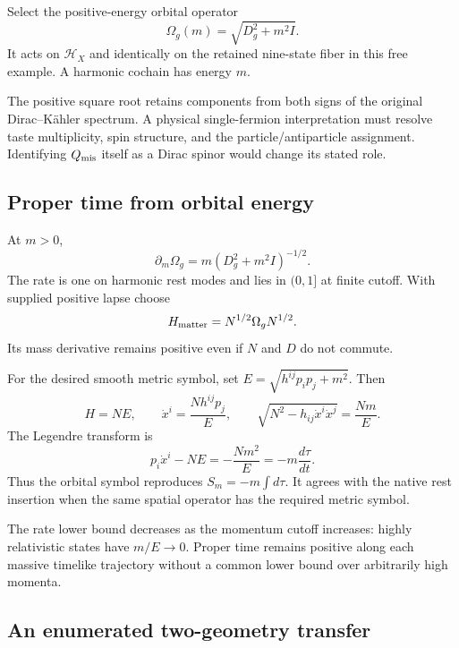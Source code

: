 Select the positive-energy orbital operator
\begin{equation}
\Omega_g(m)=\sqrt{D_g^2+m^2I}.
\label{eq:omega}
\end{equation}
It acts on $\mathcal H_X$ and identically on the retained nine-state fiber in this free example. A harmonic cochain has energy $m$.

The positive square root retains components from both signs of the original Dirac--Kähler spectrum. A physical single-fermion interpretation must resolve taste multiplicity, spin structure, and the particle/antiparticle assignment. Identifying $Q_{\rm mis}$ itself as a Dirac spinor would change its stated role.

\subsection{Proper time from orbital energy}

At $m>0$,
\begin{equation}
\partial_m\Omega_g=m(D_g^2+m^2I)^{-1/2}.
\end{equation}
The rate is one on harmonic rest modes and lies in $(0,1]$ at finite cutoff. With supplied positive lapse choose
\begin{equation}
H_{\rm matter}=N^{1/2}\Omega_gN^{1/2}.
\end{equation}
Its mass derivative remains positive even if $N$ and $D$ do not commute.

For the desired smooth metric symbol, set $E=\sqrt{h^{ij}p_ip_j+m^2}$. Then
\begin{equation}
H=NE,\qquad
\dot x^i=\frac{Nh^{ij}p_j}{E},
\qquad
\sqrt{N^2-h_{ij}\dot x^i\dot x^j}=\frac{Nm}{E}.
\end{equation}
The Legendre transform is
\begin{equation}
p_i\dot x^i-NE=-\frac{Nm^2}{E}
=-m\frac{d\tau}{dt}.
\end{equation}
Thus the orbital symbol reproduces $S_m=-m\int d\tau$. It agrees with the native rest insertion when the same spatial operator has the required metric symbol.

The rate lower bound decreases as the momentum cutoff increases: highly relativistic states have $m/E\to0$. Proper time remains positive along each massive timelike trajectory without a common lower bound over arbitrarily high momenta.

\subsection{An enumerated two-geometry transfer}

